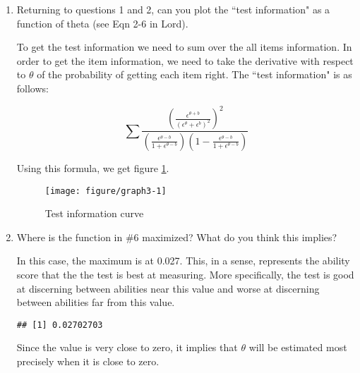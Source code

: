 \documentclass{article}\usepackage[]{graphicx}\usepackage[]{color}
\makeatletter
\def\maxwidth{ %
  \ifdim\Gin@nat@width>\linewidth
    \linewidth
  \else
    \Gin@nat@width
  \fi
}
\newenvironment{kframe}{%
 \def\at@end@of@kframe{}%
 \ifinner\ifhmode%
  \def\at@end@of@kframe{\end{minipage}}%
  \begin{minipage}{\columnwidth}%
 \fi\fi%
 \def\FrameCommand##1{\hskip\@totalleftmargin \hskip-\fboxsep
 \colorbox{shadecolor}{##1}\hskip-\fboxsep
     \hskip-\linewidth \hskip-\@totalleftmargin \hskip\columnwidth}%
 \MakeFramed {\advance\hsize-\width
   \@totalleftmargin\z@ \linewidth\hsize
   \@setminipage}}%
 {\par\unskip\endMakeFramed%
 \at@end@of@kframe}
\newenvironment{knitrout}{}{} %
\newcommand\ddfrac[2]{\frac{\displaystyle #1}{\displaystyle #2}}
\makeatother
\begin{document}
\begin{enumerate}
\item Returning to questions 1 and 2, can you plot the ``test information" as a function of theta (see Eqn 2-6 in Lord). 

To get the test information we need to sum over the all items information. In order to get the item information, we need to take the derivative with respect to $\theta$ of the probability of getting each item right. The ``test information" is as follows:

$$ \displaystyle\sum \ddfrac{\left(\ddfrac{\epsilon^{\theta+b}}{\left(\epsilon^{\theta}+\epsilon^{b}\right)^2}\right)^2}{\left(\ddfrac{\epsilon^{\theta-b}}{1+ \epsilon^{\theta-b}}\right) \left(1 - \ddfrac{\epsilon^{\theta-b}}{1 + \epsilon^{\theta-b}}\right)} $$

Using this formula, we get figure \ref{fig:graph3}.

\begin{knitrout}
\color{fgcolor}\begin{figure}[H]

{\centering \texttt{[image: figure/graph3-1]} 

}

\caption[Test information curve]{Test information curve}\label{fig:graph3}
\end{figure}


\end{knitrout}

\item Where is the function in \#6 maximized? What do you think this implies? 

In this case, the maximum is at 0.027.  This, in a sense, represents the ability score that the the test is best at measuring.  More specifically, the test is good at discerning between abilities near this value and worse at discerning between abilities far from this value.

\begin{knitrout}
\color{fgcolor}\begin{kframe}
\begin{verbatim}
## [1] 0.02702703
\end{verbatim}
\end{kframe}
\end{knitrout}

Since the value is very close to zero, it implies that $\theta$ will be
estimated most precisely when it is close to zero.


\end{enumerate}
\end{document}
